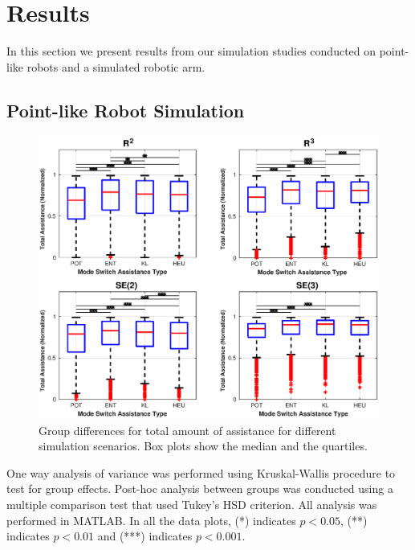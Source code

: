 \documentclass[conference]{IEEEtran}
\begin{document}
\section{Results}\label{sec:results}

In this section we present results from our simulation studies conducted on point-like robots and a simulated robotic arm. 
\subsection{Point-like Robot Simulation}
\begin{figure}[t]
	\centering
	\includegraphics[width= 1.\hsize, height=0.55\vsize]{./figures/total_assistance.eps}
	\vspace{-0.8cm}
	\caption{Group differences for total amount of assistance for different simulation scenarios. Box plots show the median and the quartiles.} 
	\label{fig:total_assistance}
\end{figure}
One way analysis of variance was performed using Kruskal-Wallis procedure to test for group effects. Post-hoc analysis between groups was conducted using a multiple comparison test that used Tukey's HSD criterion. All analysis was performed in MATLAB. In all the data plots, (*) indicates $p < 0.05$, (**) indicates $p < 0.01$ and (***) indicates $p < 0.001$.
\end{document}
